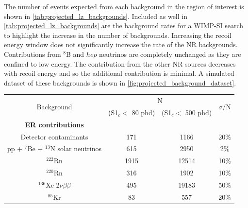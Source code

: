 \par
The number of events expected from each background in the region of interest is shown in \autoref{tab:projected_lz_backgrounds}.
Included as well in \autoref{tab:projected_lz_backgrounds} are the background rates for a WIMP-SI search to highlight the increase in the number of backgrounds.
Increasing the recoil energy window does not significantly increase the rate of the NR backgrounds.
Contributions from ${}^{8}$B and $hep$ neutrinos are completely unchanged as they are confined to low energy.
The contribution from the other NR sources decreases with recoil energy and so the additional contribution is minimal.
A simulated dataset of these backgrounds is shown in  \autoref{fig:projected_background_dataset}.

\begin{table}[]
    \centering
    \begin{tabular}{c|c|c|c}
        \multirow{2}{*}{Background}                  & \multicolumn{2}{c}{N}                            & \multirow{2}{*}{$\sigma$/N}  \\ 
                                                     &  (S1$_c <$ 80 phd)     & (S1$_c <$ 500 phd)      &              \\ \hline
        \textbf{ER contributions}                    &                        &                         &   \\
        Detector contaminants                        & 171                    & 1166                    & 20\% \cite{LZ_projected_sensitivity_paper_ref}        \\
        pp + ${}^{7}$Be + ${}^{13}$N solar neutrinos & 615                    & 2950                    & 2\% \cite{pp_solar_neutrinos_rate_ref}       \\
        ${}^{222}$Rn                                 & 1915                   & 12514                   & 10\% \cite{lz_predicted_radon_rate_ref}        \\
        ${}^{220}$Rn                                 & 316                    & 1902                    & 10\% \cite{lz_predicted_radon_rate_ref}        \\
        ${}^{136}$Xe 2$\nu\beta\beta$                & 495                    & 19183                   & 50\% \cite{double_beta_decay_rate_ref}        \\
        ${}^{85}$Kr                                  & 83                     & 557                     & 20\% \cite{kr85_rate_ref}         \\ \hline

\end{tabular}
\end{table}
